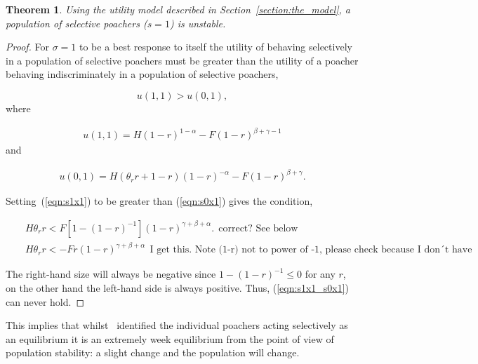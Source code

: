 \documentclass[10pt]{article}
\newtheorem{theorem}{Theorem}
\begin{document}
\begin{theorem}
Using the utility model described in Section~\ref{section:the_model}, 
a population of selective poachers (\(s=1\)) is unstable.
\end{theorem}

\begin{proof}
    For \(\sigma=1\) to be a best response to itself the utility of behaving 
    selectively in a population of selective poachers must be greater than the utility
    of a poacher behaving indiscriminately in a population of selective poachers,

    \begin{equation}
    u(1,1) > u(0,1),
    \end{equation}    
    where
    
    \begin{eqnarray}
    \label{eqn:s1x1}
    u(1,1) = H(1 - r)^{1 - \alpha} - F(1 - r)^{\beta + \gamma - 1}
    \end{eqnarray}    
    and 
    
    \begin{eqnarray}
    \label{eqn:s0x1}
    u(0,1) = H(\theta_r r +1 - r)(1 - r)^{-\alpha} - F(1 - r)^{\beta + \gamma} .
    \end{eqnarray}

    Setting~(\ref{eqn:s1x1}) to be greater than (\ref{eqn:s0x1}) gives the 
    condition,

    \begin{eqnarray}
    \label{eqn:s1x1_s0x1}
    &&H \theta_r r < F [1 - (1 - r)^{-1}](1 - r)^{\gamma + \beta + \alpha}.\:\:\mbox{correct? See below}
    \\
    &&H \theta_r r < -Fr(1 - r)^{\gamma + \beta + \alpha} \:\: \mbox{I get this. Note (1-r) not to power of -1, please check because I don´t have a computer!}
    \end{eqnarray}

    The right-hand size  will always be negative since \(1-(1-r)^{-1} \leq 0\)
    for any \(r\), on the other hand the left-hand side is always positive.
    Thus, (\ref{eqn:s1x1_s0x1}) can never hold. %
\end{proof}

This implies that whilst~\cite{Lee} identified the individual poachers 
acting selectively as an equilibrium it is an extremely week equilibrium from 
the point of view of population stability: a slight change and the population 
will change.
\end{document}

